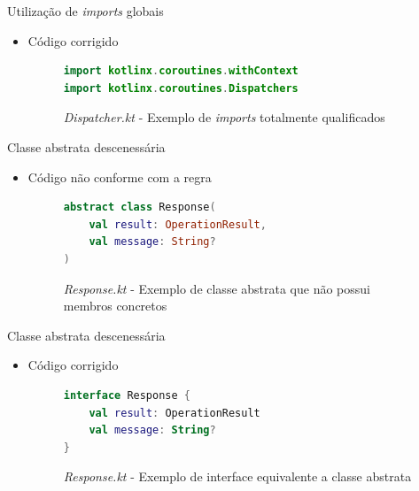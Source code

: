 \documentclass[brazilian]{beamer}
\begin{document}
\begin{frame}[fragile]{Utilização de \textit{imports} globais}
    \begin{itemize}
        \item Código corrigido
        \begin{figure}[H]
            \centering
            \begin{lstlisting}[language=Kotlin]
import kotlinx.coroutines.withContext
import kotlinx.coroutines.Dispatchers
            \end{lstlisting}
            \caption{\textit{Dispatcher.kt} - Exemplo de \textit{imports} totalmente qualificados}
            \label{fig:detekt_wildcard_imports_after_example}
        \end{figure}
    \end{itemize}
\end{frame}

\begin{frame}[fragile]{Classe abstrata descenessária}
    \begin{itemize}
        \item Código não conforme com a regra
        \begin{figure}[H]
            \centering
            \begin{lstlisting}[language=Kotlin]
abstract class Response(
    val result: OperationResult,
    val message: String?
)
            \end{lstlisting}
            \caption{\textit{Response.kt} - Exemplo de classe abstrata que não possui membros concretos}
            \label{fig:detekt_unnecessary_abstract_class_before_example}
        \end{figure}
    \end{itemize}
\end{frame}

\begin{frame}[fragile]{Classe abstrata descenessária}
    \begin{itemize}
        \item Código corrigido
        \begin{figure}[H]
            \centering
            \begin{lstlisting}[language=Kotlin]
interface Response {
    val result: OperationResult
    val message: String?
}
            \end{lstlisting}
            \caption{\textit{Response.kt} - Exemplo de interface equivalente a classe abstrata}
            \label{fig:detekt_unnecessary_abstract_class_after_example}
        \end{figure}
    \end{itemize}
\end{frame}
\end{document}
